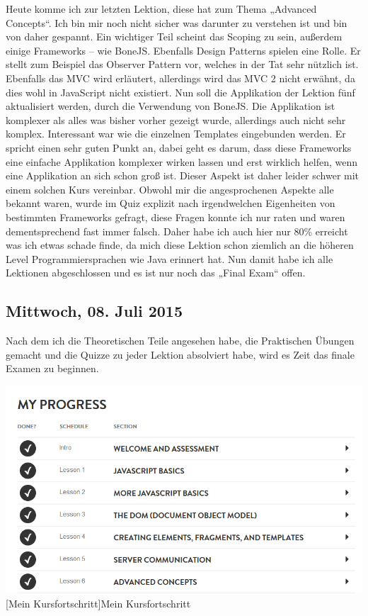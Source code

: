 \documentclass[12pt,a4paper,bibliography=totocnumbered,listof=totocnumbered]{scrartcl}
\begin{document}
Heute komme ich zur letzten Lektion, diese hat zum Thema „Advanced Concepts“. Ich bin mir noch nicht sicher was darunter zu verstehen ist und bin von daher gespannt. Ein wichtiger Teil scheint das Scoping zu sein, außerdem einige Frameworks – wie BoneJS. Ebenfalls Design Patterns spielen eine Rolle. Er stellt zum Beispiel das Observer Pattern vor, welches in der Tat sehr nützlich ist.  Ebenfalls das MVC wird erläutert, allerdings wird das MVC 2 nicht erwähnt, da dies wohl in JavaScript nicht existiert. 
Nun soll die Applikation der Lektion fünf aktualisiert werden, durch die Verwendung von BoneJS. 
Die Applikation ist komplexer als alles was bisher vorher gezeigt wurde, allerdings auch nicht sehr komplex. Interessant war wie die einzelnen Templates eingebunden werden. 
Er spricht einen sehr guten Punkt an, dabei geht es darum, dass diese Frameworks eine einfache Applikation komplexer wirken lassen und erst wirklich helfen, wenn eine Applikation an sich schon groß ist.  Dieser Aspekt ist daher leider schwer mit einem solchen Kurs vereinbar. 
Obwohl mir die angesprochenen Aspekte alle bekannt waren, wurde im Quiz explizit nach irgendwelchen Eigenheiten von bestimmten Frameworks gefragt, diese Fragen konnte ich nur raten und waren dementsprechend fast immer falsch. Daher habe ich auch hier nur 80\% erreicht was ich etwas schade finde, da mich diese Lektion schon ziemlich an die höheren Level Programmiersprachen wie Java erinnert hat. 
Nun damit habe ich alle Lektionen abgeschlossen und es ist nur noch das „Final Exam“ offen. 

\subsection{Mittwoch, 08. Juli 2015}

Nach dem ich die Theoretischen Teile angesehen habe, die Praktischen Übungen gemacht und die Quizze zu jeder Lektion absolviert habe, wird es Zeit das finale Examen zu beginnen. 

\vspace{1em}
\begin{minipage}{\linewidth}
	\centering
	\includegraphics[width=1\linewidth]{Bilder/zeugs.png}
	[Mein Kursfortschritt]{Mein Kursfortschritt \footnotemark }
	\label{fig:osgi}
\end{minipage}
\end{document}
